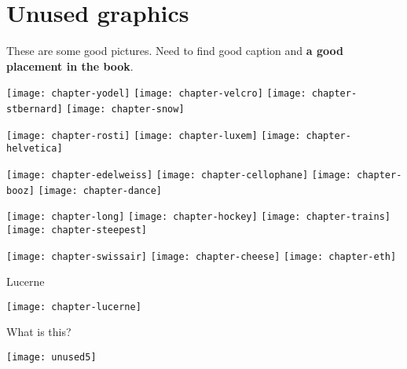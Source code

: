 

\section{Unused graphics}

These are some good pictures. Need to find good caption and \textbf{a good placement in the book}.

\texttt{[image: chapter-yodel]}
\texttt{[image: chapter-velcro]}
\texttt{[image: chapter-stbernard]}
\texttt{[image: chapter-snow]}

\texttt{[image: chapter-rosti]}
\texttt{[image: chapter-luxem]}
\texttt{[image: chapter-helvetica]}

\texttt{[image: chapter-edelweiss]}
\texttt{[image: chapter-cellophane]}
\texttt{[image: chapter-booz]}
\texttt{[image: chapter-dance]}

\texttt{[image: chapter-long]}
\texttt{[image: chapter-hockey]}
\texttt{[image: chapter-trains]}
\texttt{[image: chapter-steepest]}

\texttt{[image: chapter-swissair]}
\texttt{[image: chapter-cheese]}
\texttt{[image: chapter-eth]}

Lucerne

\texttt{[image: chapter-lucerne]}

What is this?

\texttt{[image: unused5]}


